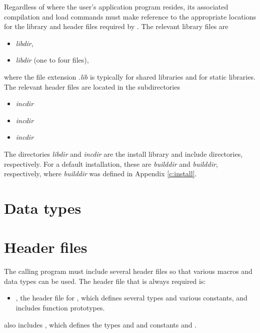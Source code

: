 Regardless of where the user's application program resides, its
associated compilation and load commands must make reference to the
appropriate locations for the library and header files required by
{\kinsol}.  The relevant library files are
\begin{itemize}
\item {\em libdir},
\item {\em libdir} (one to four files),
\end{itemize}
where the file extension .{\em lib} is typically  for shared libraries
and  for static libraries. The relevant header files are located in
the subdirectories
\begin{itemize}
\item {\em incdir}
\item {\em incdir}
\item {\em incdir}
\end{itemize}
The directories {\em libdir} and {\em incdir} are the install library
and include directories, respectively.  For a default installation,
these are {\em builddir} and {\em builddir},
respectively, where {\em builddir} was defined in Appendix \ref{c:install}.

\section{Data types}\label{s:types}


\section{Header files}\label{s:header_sol}
The calling program must include several header files so that various macros
and data types can be used. The header file that is always required is:
%
\begin{itemize}
\item  {}, 
  the header file for {\kinsol}, which defines several
  types and various constants, and includes function prototypes.
\end{itemize}
%
 also includes , 
which defines the types  and 
and constants  and .

